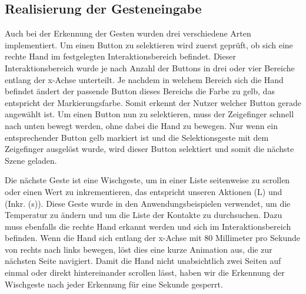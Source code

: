 \subsection[Geste]{Realisierung der Gesteneingabe} Auch bei der Erkennung der Gesten wurden drei verschiedene Arten implementiert. 
Um einen Button zu selektieren wird zuerst geprüft, ob sich eine rechte Hand im festgelegten Interaktionsbereich befindet. 
Dieser Interaktionsbereich wurde je nach Anzahl der Buttons in drei oder vier Bereiche entlang der x-Achse unterteilt. 
Je nachdem in welchem Bereich sich die Hand befindet ändert der passende Button dieses Bereichs die Farbe zu gelb, das entspricht der Markierungsfarbe. 
Somit erkennt der Nutzer welcher Button gerade angewählt ist. 
Um einen Button nun zu selektieren, muss der Zeigefinger schnell nach unten bewegt werden, ohne dabei die Hand zu bewegen. 
Nur wenn ein entsprechender Button gelb markiert ist und die Selektionsgeste mit dem Zeigefinger ausgelöst wurde, wird dieser Button selektiert und somit die nächste Szene geladen. 

Die nächste Geste ist eine Wischgeste, um in einer Liste seitenweise zu scrollen oder einen Wert zu inkrementieren, das entspricht unseren Aktionen (L) und (Inkr. (s)). 
Diese Geste wurde in den Anwendungsbeispielen verwendet, um die Temperatur zu ändern und um die Liste der Kontakte zu durchsuchen. 
Dazu muss ebenfalls die rechte Hand erkannt werden und sich im Interaktionsbereich befinden. 
Wenn die Hand sich entlang der x-Achse mit 80 Millimeter pro Sekunde von rechts nach links bewegen, löst dies eine kurze Animation aus, die zur nächsten Seite navigiert. 
Damit die Hand nicht unabsichtlich zwei Seiten auf einmal oder direkt hintereinander scrollen lässt, haben wir die Erkennung der Wischgeste nach jeder Erkennung  für eine Sekunde gesperrt. 

